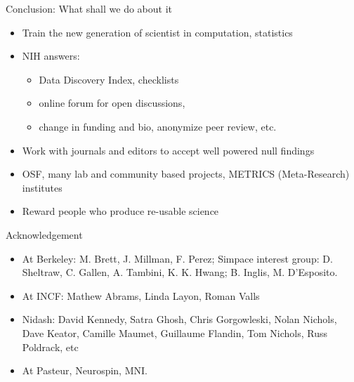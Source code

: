 \documentclass[ignorenonframetext,]{beamer}
\begin{document}
\begin{frame}{Conclusion: What shall we do about it}

\begin{itemize}[<+->]
\itemsep1pt\parskip0pt
\item
  Train the new generation of scientist in computation, statistics
\item
  NIH answers:

  \begin{itemize}[<+->]
  \itemsep1pt\parskip0pt
  \item
    Data Discovery Index, checklists
  \item
    online forum for open discussions,
  \item
    change in funding and bio, anonymize peer review, etc.
  \end{itemize}
\item
  Work with journals and editors to accept well powered null findings
\item
  OSF, many lab and community based projects, METRICS (Meta-Research)
  institutes
\item
  Reward people who produce re-usable science
\end{itemize}

\end{frame}

\begin{frame}{Acknowledgement}

\begin{itemize}
\itemsep1pt\parskip0pt
\item
  At Berkeley: M. Brett, J. Millman, F. Perez; Simpace interest group:
  D. Sheltraw, C. Gallen, A. Tambini, K. K. Hwang; B. Inglis, M.
  D'Esposito.
\item
  At INCF: Mathew Abrams, Linda Layon, Roman Valls
\item
  Nidash: David Kennedy, Satra Ghosh, Chris Gorgowleski, Nolan Nichols,
  Dave Keator, Camille Maumet, Guillaume Flandin, Tom Nichols, Russ
  Poldrack, etc
\item
  At Pasteur, Neurospin, MNI.
\end{itemize}

\end{frame}

\end{document}
